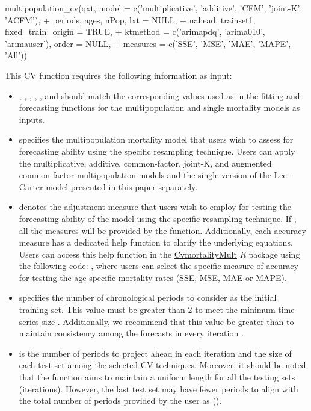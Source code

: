 \begin{example}
multipopulation_cv(qxt, model = c('multiplicative', 'additive', 'CFM', 'joint-K', 'ACFM'),
+	periods, ages, nPop, lxt = NULL,
+	nahead, trainset1, fixed_train_origin = TRUE,
+	ktmethod = c('arimapdq', 'arima010', 'arimauser'), order = NULL,
+	measures = c('SSE', 'MSE', 'MAE', 'MAPE', 'All'))
\end{example}

This CV function requires the following information as input:
\begin{itemize}
\item {}, , , , ,  and  should match the corresponding values used as in the fitting and forecasting functions for the multipopulation and single mortality models as inputs.
\item {} specifies the multipopulation mortality model that users wish to assess for forecasting ability using the specific resampling technique. Users can apply the multiplicative, additive, common-factor, joint-K, and augmented common-factor multipopulation models and the single version of the Lee-Carter model presented in this paper separately.
\item {} denotes the adjustment measure that users wish to employ for testing the forecasting ability of the model using the specific resampling technique. If , all the measures will be provided by the function. Additionally, each accuracy measure has a dedicated help function to clarify the underlying equations. Users can access this help function in the \href{https://cran.r-project.org/web/packages/CvmortalityMult/index.html}{CvmortalityMult} \emph{R} package using the following code: , where users can select the specific measure of accuracy for testing the age-specific mortality rates (SSE, MSE, MAE or MAPE).
\item {} specifies the number of chronological periods to consider as the initial training set. This value must be greater than 2 to meet the minimum time series size \citep{Hyndman2008}. Additionally, we recommend that this value be greater than  to maintain consistency among the forecasts in every iteration \citep{Tashman2000}.
\item {} is the number of periods to project ahead in each iteration and the size of each test set among the selected CV techniques. Moreover, it should be noted that the  function aims to maintain a uniform length for all the testing sets (iterations). However, the last test set may have fewer periods to align with the total number of periods provided by the user as ().

\end{itemize}
